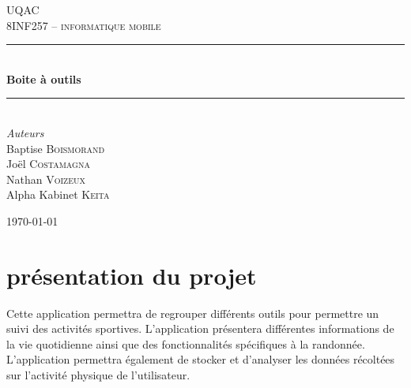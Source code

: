 \documentclass[11pt]{article}
\begin{document}
\begin{titlepage} %
	\newcommand{\HRule}{\rule{\linewidth}{0.5mm}} %
	
	\center %
	
	
	\textsc{\LARGE UQAC}\\[1.5cm] %
	
	\textsc{\Large 8INF257 -- informatique mobile}\\[0.5cm] %
	
	
	
	\HRule\\[0.4cm]
	
	{\huge\bfseries Boite à outils}\\[0.4cm] %
	
	\HRule\\[1.5cm]

	{\large\textit{Auteurs}}\\
	Baptise \textsc{Boismorand}\\
	Joël \textsc{Costamagna}\\ 
    Nathan \textsc{Voizeux} \\
	Alpha Kabinet \textsc{Keita}\\
	
	
	

	\vfill%
	
	{\large \today} 

\end{titlepage}

\section{présentation du projet}
	Cette application permettra de regrouper différents outils pour permettre un suivi des activités sportives. L'application présentera différentes informations de la vie quotidienne ainsi que des fonctionnalités spécifiques à la randonnée. L'application permettra également de stocker et d'analyser les données récoltées sur l'activité physique de l'utilisateur.
	
\end{document}
